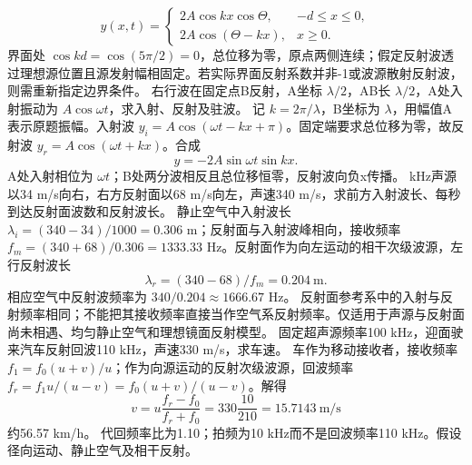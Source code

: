 \[
y(x,t)=
\begin{cases}
2A\cos kx\cos\Theta,&-d\le x\le0,\\
2A\cos(\Theta-kx),&x\ge0 .
\end{cases}
\]
\crosscheck 界面处 $\cos kd=\cos(5\pi/2)=0$，总位移为零，原点两侧连续；假定反射波透过理想源位置且源发射幅相固定。若实际界面反射系数并非-1或波源散射反射波，则需重新指定边界条件。
\problemtext 右行波在固定点B反射，A坐标 $\lambda/2$，AB长 $\lambda/2$，A处入射振动为 $A\cos\omega t$，求入射、反射及驻波。
\workings 记 $k=2\pi/\lambda$，B坐标为 $\lambda$，用幅值A表示原题振幅。入射波 $y_i=A\cos(\omega t-kx+\pi)$。固定端要求总位移为零，故反射波 $y_r=A\cos(\omega t+kx)$。合成
\[
y=-2A\sin\omega t\sin kx .
\]
\crosscheck A处入射相位为 $\omega t$；B处两分波相反且总位移恒零，反射波向负x传播。
 kHz声源以34 m/s向右，右方反射面以68 m/s向左，声速340 m/s，求前方入射波长、每秒到达反射面波数和反射波长。
\workings 静止空气中入射波长 $\lambda_i=(340-34)/1000=0.306$ m；反射面与入射波峰相向，接收频率 $f_m=(340+68)/0.306=1333.33$ Hz。反射面作为向左运动的相干次级波源，左行反射波长
\[
\lambda_r=(340-68)/f_m=0.204\ \mathrm m .
\]
相应空气中反射波频率为 $340/0.204\approx1666.67$ Hz。
\crosscheck 反射面参考系中的入射与反射频率相同；不能把其接收频率直接当作空气系反射频率。仅适用于声源与反射面尚未相遇、均匀静止空气和理想镜面反射模型。
\problemtext 固定超声源频率100 kHz，迎面驶来汽车反射回波110 kHz，声速330 m/s，求车速。
\workings 车作为移动接收者，接收频率 $f_1=f_0(u+v)/u$；作为向源运动的反射次级波源，回波频率 $f_r=f_1u/(u-v)=f_0(u+v)/(u-v)$。解得
\[
v=u\frac{f_r-f_0}{f_r+f_0}
=330\frac{10}{210}=15.7143\ \mathrm{m/s}
\]
约56.57 km/h。
\crosscheck 代回频率比为1.10；拍频为10 kHz而不是回波频率110 kHz。假设径向运动、静止空气及相干反射。

